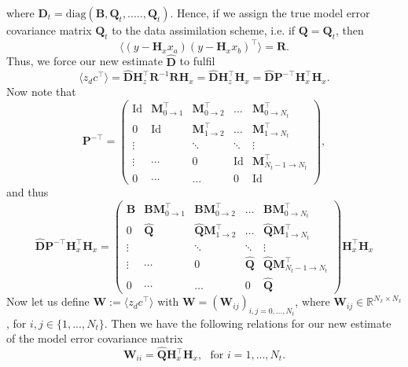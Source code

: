 \documentclass[a4paper,10pt]{article}
\numberwithin{equation}{section}
\begin{document}
where $\mathbf D_t=\text{diag}(\mathbf B, \mathbf Q_t,.....,\mathbf Q_t)$. Hence, if we assign the true model error covariance matrix $\mathbf Q_t$ to the data assimilation scheme, i.e. if $\mathbf Q=\mathbf Q_t$, then 
\begin{equation}
\langle  \left(y- \mathbf H_x x_a \right)  \left(y- \mathbf H_x x_b \right)^\top\rangle =\mathbf R.
\end{equation}
Thus, we force our new estimate $\hat{\mathbf D}$ to fulfil 
\begin{equation}
\langle z_d c^\top\rangle =\hat {\mathbf D} \mathbf H_z^\top \mathbf R^{-1}\mathbf R\mathbf H_x=\hat {\mathbf D} \mathbf H_z^\top\mathbf H_x=\hat {\mathbf D} \mathbf P^{-\top }\mathbf H_x^\top \mathbf H_x.
\end{equation}
Now note that 
\begin{equation}
\mathbf P^{-\top } = 
\begin{pmatrix}
\text{Id}& \mathbf M_{0\to 1}^\top  & \mathbf M_{0\to 2}^\top & \hdots&\mathbf M_{0\to N_t}^\top \\
0 & \text{Id} & \mathbf M_{1\to 2}^\top  &\hdots& \mathbf M_{1\to N_t}^\top \\
\vdots &  & \ddots & \ddots&\vdots\\
\vdots& \cdots & 0&\text{Id}&\mathbf M_{N_t-1\to N_t}^\top\\
0 & \cdots &\hdots& 0 & \text{Id} 
\end{pmatrix},
\end{equation}
and thus 
\begin{equation}
\hat{\mathbf D}\mathbf P^{-\top}\mathbf H_x^\top \mathbf H_x=\begin{pmatrix}
\mathbf B& \mathbf B\mathbf M_{0\to 1}^\top  & \mathbf B\mathbf M_{0\to 2}^\top & \hdots&\mathbf B\mathbf M_{0\to N_t}^\top \\
0 &  \hat{\mathbf Q} & \hat{\mathbf Q}\mathbf M_{1\to 2}^\top  &\hdots&  \hat{\mathbf Q}\mathbf M_{1\to N_t}^\top \\
\vdots &  & \ddots & \ddots&\vdots\\
\vdots& \cdots & 0& \hat{\mathbf Q}& \hat{\mathbf Q}\mathbf M_{N_t-1\to N_t}^\top\\
0 & \cdots &\hdots& 0 & \hat{\mathbf Q}
\end{pmatrix}\mathbf H_x^\top \mathbf H_x
\end{equation}
Now  let us define $\mathbf W:=\langle z_dc^\top\rangle$  with $\mathbf W=(\mathbf W_{ij})_{i,j=0,...,N_t}$, where $\mathbf W_{ij} \in \mathbb R^{N_x\times N_x}$, for $i,j \in \{1,...,N_t\}$. Then we have the following relations for our new estimate of the model error covariance matrix
\begin{equation}
\mathbf W_{ii}=\hat{\mathbf Q}\mathbf H_x^\top \mathbf H_x, \ \ \ \text{for } i=1,...,N_t.
\label{eqn:wqh}
\end{equation}
\end{document}
